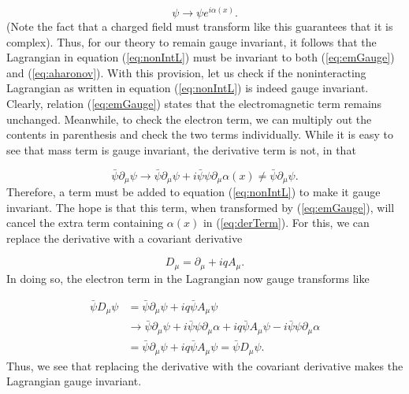 \documentclass{article}
\begin{document}
\begin{equation}
    \label{eq:aharonov}
    \psi\rightarrow\psi e^{i\alpha(x)}.
\end{equation}
%
(Note the fact that a charged field must transform like this guarantees that it is complex).  Thus, for our theory to remain gauge invariant, it follows that the Lagrangian in equation (\ref{eq:nonIntL}) must be invariant to both (\ref{eq:emGauge}) and (\ref{eq:aharonov}).
With this provision, let us check if the noninteracting Lagrangian as written in equation (\ref{eq:nonIntL}) is indeed gauge invariant.  Clearly, relation (\ref{eq:emGauge}) states that the electromagnetic term remains unchanged.  Meanwhile, to check the electron term, we can multiply out the contents in parenthesis and check the two terms individually.  While it is easy to see that mass term is gauge invariant, the derivative term is not, in that

\begin{equation}
\label{eq:derTerm}
    \bar{\psi}\partial_\mu\psi
    \rightarrow
    \bar{\psi}\partial_\mu\psi + i\bar{\psi}\psi\partial_\mu\alpha(x)
    \neq
    \bar{\psi}\partial_\mu\psi.
\end{equation}
%
Therefore, a term must be added to equation (\ref{eq:nonIntL}) to make it gauge invariant.  The hope is that this term, when transformed by (\ref{eq:emGauge}), will cancel the extra term containing $\alpha(x)$ in (\ref{eq:derTerm}).  For this, we can replace the derivative with a covariant derivative

\begin{equation}
    \label{eq:covDer}
    D_\mu = \partial_\mu + iqA_\mu.
\end{equation}
%
In doing so, the electron term in the Lagrangian now gauge transforms like

\begin{equation}
    \begin{aligned}
\bar{\psi}D_\mu\psi
&=
\bar{\psi}\partial_\mu\psi + iq\bar{\psi}A_\mu\psi
\\&\rightarrow
\bar{\psi}\partial_\mu\psi + i\bar{\psi}\psi\partial_\mu\alpha
+
iq\bar{\psi}A_\mu\psi - i\bar{\psi}\psi\partial_\mu\alpha
\\&=
\bar{\psi}\partial_\mu\psi + iq\bar{\psi}A_\mu\psi
=
\bar{\psi}D_\mu\psi.
\end{aligned}
\end{equation}
%
Thus, we see that replacing the derivative with the covariant derivative makes the Lagrangian gauge invariant.
\end{document}
